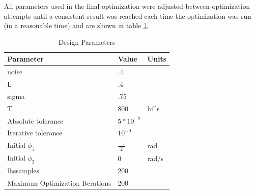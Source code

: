 \documentclass[11pt]{article}%
\begin{document}
All parameters used in the final optimization were adjusted between optimization attempts until a consistent result was reached each time the optimization was run (in a reasonable time) and are shown in table \ref{tab:param}.

\begin{table}[H]
\center
\caption{Design Parameters}
\label{tab:param}
\center
\begin{tabular}{lll}
Parameter                       & Value & Units \\ \hline
noise                           & .4    &       \\
L                               & .4    &       \\
sigma                           & .75   &       \\
T                               & 800   & hills \\
Absolute tolerance              & $5*10^{-2}$ &       \\
Iterative tolerance             & $10^{-9}$  &       \\
Initial $\phi_{1} $                           & $\frac{-\pi}{2}$ & rad   \\
Initial $\phi_{2}   $                         & 0     & rad/s \\
lhssamples                      & 200   &       \\
Maximum Optimization Iterations & 200   &      
\end{tabular}
\end{table}
\end{document}
